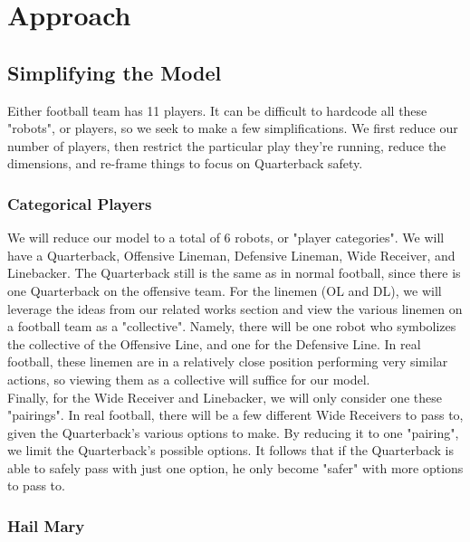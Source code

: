 

\section{Approach}

\subsection{Simplifying the Model}

\quad Either football team has 11 players. It can be difficult to hardcode all these "robots", or players, so we seek to make a few simplifications. We first reduce our number of players, then restrict the particular play they're running, reduce the dimensions, and re-frame things to focus on Quarterback safety.

\subsubsection{Categorical Players}

\quad We will reduce our model to a total of 6 robots, or "player categories". We will have a Quarterback, Offensive Lineman, Defensive Lineman, Wide Receiver, and Linebacker. The Quarterback still is the same as in normal football, since there is one Quarterback on the offensive team. For the linemen (OL and DL), we will leverage the ideas from our related works section and view the various linemen on a football team as a "collective". Namely, there will be one robot who symbolizes the collective of the Offensive Line, and one for the Defensive Line. In real football, these linemen are in a relatively close position performing very similar actions, so viewing them as a collective will suffice for our model. \\

Finally, for the Wide Receiver and Linebacker, we will only consider one these "pairings". In real football, there will be a few different Wide Receivers to pass to, given the Quarterback's various options to make. By reducing it to one "pairing", we limit the Quarterback's possible options. It follows that if the Quarterback is able to safely pass with just one option, he only become "safer" with more options to pass to.

\subsubsection{Hail Mary}

